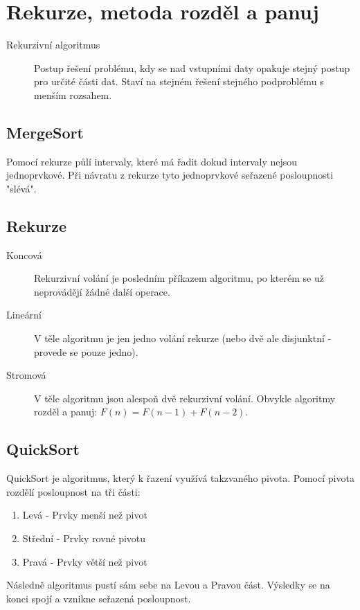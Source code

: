 \section{Rekurze, metoda rozděl a panuj}
  \begin{description}
    \item[Rekurzivní algoritmus] Postup řešení problému, kdy se nad vstupními daty opakuje stejný postup pro určité části dat. Staví na stejném řešení stejného podproblému s menším rozsahem.
  \end{description}

  \subsection{MergeSort}
    Pomocí rekurze půlí intervaly, které má řadit dokud intervaly nejsou jednoprvkové. Při návratu z rekurze tyto jednoprvkové seřazené posloupnosti "slévá".

  \subsection{Rekurze}
    \begin{description}
      \item[Koncová] Rekurzivní volání je posledním příkazem algoritmu, po kterém se už neprovádějí žádné další operace.
      \item[Lineární] V těle algoritmu je jen jedno volání rekurze (nebo dvě ale disjunktní - provede se pouze jedno).
      \item[Stromová] V těle algoritmu jsou alespoň dvě rekurzivní volání. Obvykle algoritmy rozděl a panuj: $F(n) = F(n-1) + F(n-2)$.
    \end{description}

  \subsection{QuickSort}
    QuickSort je algoritmus, který k řazení využívá takzvaného pivota. Pomocí pivota rozdělí posloupnost na tři části:
    \begin{enumerate}
      \item Levá - Prvky menší než pivot
      \item Střední - Prvky rovné pivotu
      \item Pravá - Prvky větší než pivot
    \end{enumerate}

    Následně algoritmus pustí sám sebe na Levou a Pravou část. Výsledky se na konci spojí a vznikne seřazená posloupnost.

